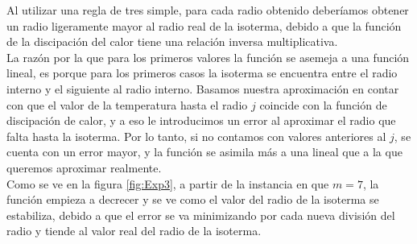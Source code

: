 Al utilizar una regla de tres simple, para cada radio obtenido deberíamos obtener un radio ligeramente mayor al radio real de la isoterma, debido a que la función de la discipación del calor tiene una relación inversa multiplicativa.\\
La razón por la que para los primeros valores la función se asemeja a una función lineal, es porque para los primeros casos la isoterma se encuentra entre el radio interno y el siguiente al radio interno. Basamos nuestra aproximación en contar con que el valor de la temperatura hasta el radio $j$ coincide con la función de discipación de calor, y a eso le introducimos un error al aproximar el radio que falta hasta la isoterma. Por lo tanto, si no contamos con valores anteriores al $j$, se cuenta con un error mayor, y la función se asimila más a una lineal que a la que queremos aproximar realmente.\\
Como se ve en la figura \ref{fig:Exp3}, a partir de la instancia en que $m=7$, la función empieza a decrecer y se ve como el valor del radio de la isoterma se estabiliza, debido a que el error se va minimizando por cada nueva división del radio y tiende al valor real del radio de la isoterma.